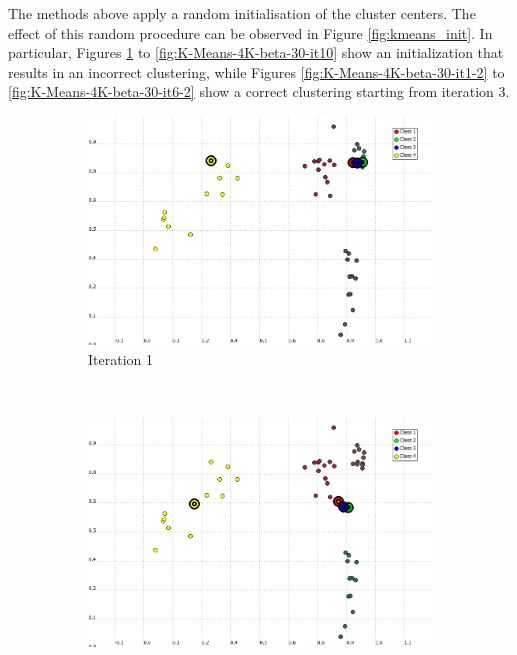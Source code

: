 \documentclass[a4paper,10pt]{article}
\begin{document}
The methods above apply a random initialisation of the cluster centers. The effect of this random procedure can be observed in Figure \ref{fig:kmeans_init}. In particular, Figures \ref{fig:K-Means-4K-beta-30-it1} to \ref{fig:K-Means-4K-beta-30-it10} show an initialization that results in an incorrect clustering, while Figures \ref{fig:K-Means-4K-beta-30-it1-2} to \ref{fig:K-Means-4K-beta-30-it6-2} show a correct clustering starting from iteration 3.

\begin{figure}[H]
\centering
    \begin{subfigure}[t]{0.2\textwidth}
      \centering
      \includegraphics[width=\textwidth]{pictures/K-Means-4K-beta-30-it1.png}
      \caption{Iteration 1}
      \label{fig:K-Means-4K-beta-30-it1}
     \end{subfigure}
      ~
    \begin{subfigure}[t]{0.2\textwidth}
      \centering
      \includegraphics[width=\textwidth]{pictures/K-Means-4K-beta-30-it2.png}

\end{subfigure}
\end{figure}
\end{document}

